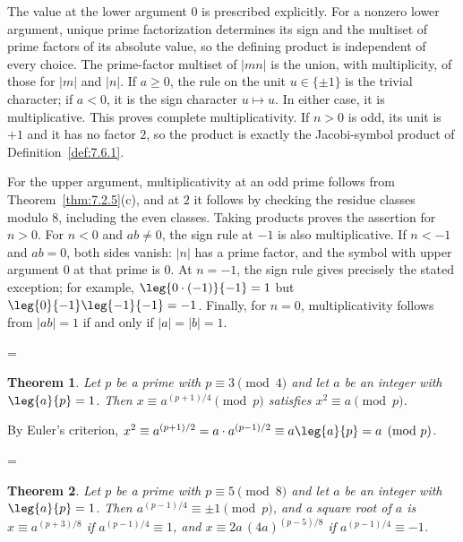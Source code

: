 \documentclass[11pt]{article}
\makeatletter
\theoremstyle{ntstyle}
\newtheorem{theorem}{Theorem}[subsection]
\let\nt@closedisplay\]
\def\nt@guardedclose{\@ifnextchar\par{\nt@closeafterpar}{\@ifnextchar\end{\postdisplaypenalty\@M\nt@closedisplay}{\nt@closedisplay}}}
\def\nt@closeafterpar\par{\@ifnextchar\par{\nt@closeafterpar}{\@ifnextchar\end{\postdisplaypenalty\@M\nt@closedisplay\par}{\nt@closedisplay\par}}}
\renewenvironment{proof}[1][\proofname]{\par
  \pushQED{\qed}\normalfont\topsep\medskipamount\edef\nt@afterproof{\@endparpenalty=\the\@endparpenalty\relax}\@beginparpenalty\@M\@endparpenalty\@M\let\]\nt@guardedclose\trivlist\item[]\textit{#1\@addpunct{.}} \ignorespaces}{\ifvmode\addpenalty\@M\fi\popQED\nt@afterproof\endtrivlist\@endpefalse}
\makeatother
\begin{document}
\begin{proof} The value at the lower argument $0$ is prescribed
	explicitly. For a nonzero lower argument, unique prime factorization
	determines its sign and the multiset of prime factors of its absolute
	value, so the defining product is independent of every choice. The
	prime-factor multiset of $|mn|$ is the union, with multiplicity, of
	those for $|m|$ and $|n|$. If $a\ge0$, the rule on the unit
	$u\in\{\pm1\}$ is the trivial character; if $a<0$, it is the sign
	character $u\mapsto u$. In either case, it is multiplicative. This proves complete
	multiplicativity. If $n>0$ is odd, its unit is $+1$ and it has no factor
	$2$, so the product is exactly the Jacobi-symbol product of Definition~\ref{def:7.6.1}.

	For the upper argument, multiplicativity at an odd prime follows from
	Theorem~\ref{thm:7.2.5}(c), and at $2$ it follows by checking the
	residue classes modulo $8$, including the even classes. Taking products
	proves the assertion for $n>0$. For $n<0$ and $ab\ne0$, the sign rule
	at $-1$ is also multiplicative. If $n<-1$ and $ab=0$, both sides vanish:
	$|n|$ has a prime factor, and the symbol with upper argument $0$ at
	that prime is $0$. At $n=-1$, the sign rule gives precisely the stated
	exception; for example, $\leg{0\cdot(-1)}{-1}=1$ but
	$\leg{0}{-1}\leg{-1}{-1}=-1$. Finally, for $n=0$, multiplicativity
	follows from $|ab|=1$ if and only if $|a|=|b|=1$.

\end{proof}
\begin{theorem}\label{thm:7.6.5} Let $p$ be a prime with $p \equiv 3
		\pmod{4}$ and let $a$ be an integer with $\leg{a}{p} = 1$. Then $x
		\equiv a^{(p+1)/4} \pmod{p}$ satisfies $x^{2} \equiv a \pmod{p}$.

\end{theorem}

\begin{proof} By Euler's criterion, $x^2 \equiv a^{(p+1)/2} = a \cdot a^{(p-1)/2}
		\equiv a\leg{a}{p} = a \pmod{p}$.

\end{proof}
\begin{theorem}\label{thm:7.6.6} Let $p$ be a prime with $p \equiv 5
		\pmod{8}$ and let $a$ be an integer with $\leg{a}{p} = 1$. Then
	$a^{(p-1)/4} \equiv \pm 1 \pmod{p}$, and a square root of $a$ is $x \equiv
		a^{(p+3)/8}$ if $a^{(p-1)/4} \equiv 1$, and $x \equiv
		2a\,(4a)^{(p-5)/8}$ if $a^{(p-1)/4} \equiv -1$.

\end{theorem}
\end{document}
